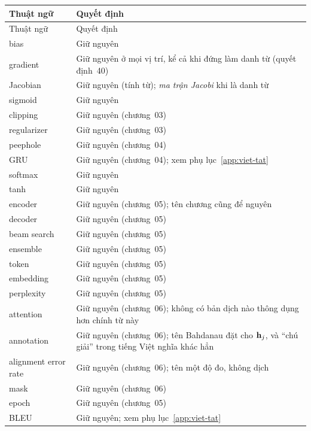 \footnotesize
\begin{longtable}{@{}lp{7cm}@{}}
\toprule
Thuật ngữ & Quyết định \\
\midrule
\endfirsthead
\toprule
Thuật ngữ & Quyết định \\
\midrule
\endhead
\bottomrule
\endlastfoot
bias & Giữ nguyên \\
gradient & Giữ nguyên ở mọi vị trí, kể cả khi đứng làm danh từ (quyết định~40) \\
Jacobian & Giữ nguyên (tính từ); \emph{ma trận Jacobi} khi là danh từ \\
sigmoid & Giữ nguyên \\
clipping & Giữ nguyên (chương~03) \\
regularizer & Giữ nguyên (chương~03) \\
peephole & Giữ nguyên (chương~04) \\
GRU & Giữ nguyên (chương~04); xem phụ lục~\ref{app:viet-tat} \\
softmax & Giữ nguyên \\
tanh & Giữ nguyên \\
encoder & Giữ nguyên (chương~05); tên chương cũng để nguyên \\
decoder & Giữ nguyên (chương~05) \\
beam search & Giữ nguyên (chương~05) \\
ensemble & Giữ nguyên (chương~05) \\
token & Giữ nguyên (chương~05) \\
embedding & Giữ nguyên (chương~05) \\
perplexity & Giữ nguyên (chương~05) \\
attention & Giữ nguyên (chương~06); không có bản dịch nào thông dụng hơn chính từ này \\
annotation & Giữ nguyên (chương~06); tên Bahdanau đặt cho \(\mathbf{h}_j\), và \enquote{chú giải} trong tiếng Việt nghĩa khác hẳn \\
alignment error rate & Giữ nguyên (chương~06); tên một độ đo, không dịch \\
mask & Giữ nguyên (chương~06) \\
epoch & Giữ nguyên (chương~05) \\
BLEU & Giữ nguyên; xem phụ lục~\ref{app:viet-tat} \\

\end{longtable}
